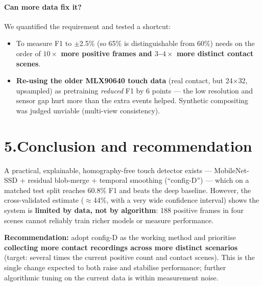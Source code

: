 \documentclass[11pt, a4paper]{article}
\begin{document}
\paragraph{Can more data fix it?} We quantified the requirement and tested a
shortcut:
\begin{itemize}[leftmargin=1.4em, itemsep=2pt]
\item To measure F1 to $\pm$2.5\% (so 65\% is distinguishable from 60\%) needs
      on the order of \textbf{$10\times$ more positive frames and $3$--$4\times$
      more distinct contact scenes}.
\item \textbf{Re-using the older MLX90640 touch data} (real contact, but
      24$\times$32, upsampled) as pretraining \emph{reduced} F1 by 6 points ---
      the low resolution and sensor gap hurt more than the extra events helped.
      Synthetic compositing was judged unviable (multi-view consistency).
\end{itemize}

\section*{5.\quad Conclusion and recommendation}
A practical, explainable, homography-free touch detector exists --- MobileNet-SSD
+ residual blob-merge + temporal smoothing (``config-D'') --- which on a matched
test split reaches 60.8\% F1 and beats the deep baseline. However, the
cross-validated estimate ($\approx$44\%, with a very wide confidence interval) shows
the system is \textbf{limited by data, not by algorithm}: 188 positive frames in
four scenes cannot reliably train richer models or measure performance.

\textbf{Recommendation:} adopt config-D as the working method and prioritise
\textbf{collecting more contact recordings across more distinct scenarios}
(target: several times the current positive count and contact scenes). This is
the single change expected to both raise and stabilise performance; further
algorithmic tuning on the current data is within measurement noise.
\end{document}

